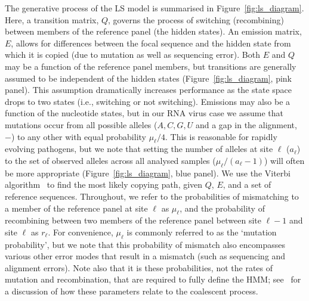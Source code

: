\documentclass{article}
\begin{document}
%
%

The generative process of the LS model is summarised in
Figure~\ref{fig:ls_diagram}. Here, a transition matrix, $Q$, governs the
process of switching (recombining) between members of the reference panel (the
hidden states). An emission matrix, $E$, allows for differences between the
focal sequence and the hidden state from which it is copied (due to mutation as
well as sequencing error).
Both $E$ and $Q$ may be a function of the reference panel members,
but transitions are generally assumed to be independent of the
hidden states (Figure~\ref{fig:ls_diagram}, pink panel).
This assumption dramatically increases performance as the state space drops to two states (i.e., switching or not switching).
Emissions may also be a function of the nucleotide states,
but in our RNA virus case
we assume that mutations occur from all possible alleles
($A,C,G,U$ and a gap in the alignment, $-$) to any other with
equal probability $\mu_\ell/4$.
This is reasonable for rapidly evolving pathogens,
but we note that setting the number of alleles at site $\ell$ ($a_\ell$)
to the set of observed alleles across all analysed
samples ($\mu_\ell/(a_\ell-1)$) will often be more appropriate
(Figure~\ref{fig:ls_diagram}, blue panel).
We use the Viterbi algorithm~\citep{Viterbi1967-ol}
to find the most likely copying path, given $Q$, $E$, and a set of reference sequences.
Throughout, we refer to the probabilities of mismatching to a
member of the reference panel at site $\ell$ as $\mu_\ell$,
and the probability of recombining between two members of the reference panel
between site $\ell-1$ and site $\ell$ as $r_\ell$. For convenience, $\mu_\ell$ is commonly referred to as the `mutation probability', but we note that this probability of
mismatch also encompasses various other error modes that result in a mismatch
(such as sequencing and alignment errors). Note also that it is these probabilities,
not the rates of mutation and recombination, that are required to fully define
the HMM; see~\cite{Donnelly2010-coalescent} for a discussion of how these
parameters relate to the coalescent process.
\end{document}
